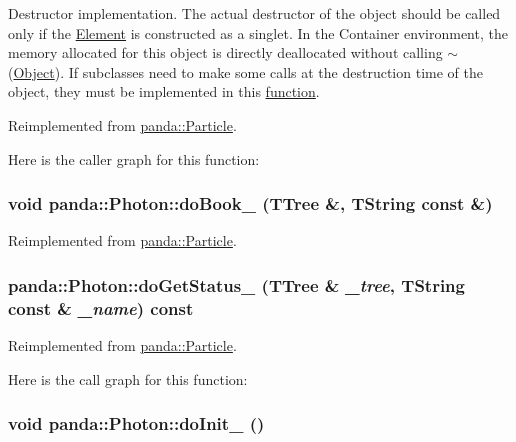 Destructor implementation. The actual destructor of the object should be called only if the \hyperlink{classpanda_1_1Element}{Element} is constructed as a singlet. In the Container environment, the memory allocated for this object is directly deallocated without calling $\sim$(\hyperlink{classpanda_1_1Object}{Object}). If subclasses need to make some calls at the destruction time of the object, they must be implemented in this \hyperlink{namespacepanda_1_1function}{function}. 

Reimplemented from \hyperlink{classpanda_1_1Particle_ad1a5f606b804ac2ec5d7e391aba6bda6}{panda::Particle}.

Here is the caller graph for this function:\hypertarget{classpanda_1_1Photon_aaa6770e70a128a4e4910899f92fbd816}{
\subsubsection[{doBook\_\-}]{\setlength{\rightskip}{0pt plus 5cm}void panda::Photon::doBook\_\- (TTree \&, \/  TString const \&)}}
\label{classpanda_1_1Photon_aaa6770e70a128a4e4910899f92fbd816}


Reimplemented from \hyperlink{classpanda_1_1Particle_a3dab1e8430ed2e287ecd8fdbbdcf3c7e}{panda::Particle}.\hypertarget{classpanda_1_1Photon_ae0b07f281f6553d7d1fe088374e6e39b}{
\subsubsection[{doGetStatus\_\-}]{ panda::Photon::doGetStatus\_\- (TTree \& {\em \_\-tree}, \/  TString const \& {\em \_\-name}) const}}
\label{classpanda_1_1Photon_ae0b07f281f6553d7d1fe088374e6e39b}


Reimplemented from \hyperlink{classpanda_1_1Particle_a7dcbf68bc3e74fdef1e3f3c620fb019a}{panda::Particle}.

Here is the call graph for this function:\hypertarget{classpanda_1_1Photon_a445fd29d5ce7a07c93443c05ae830a72}{
\subsubsection[{doInit\_\-}]{\setlength{\rightskip}{0pt plus 5cm}void panda::Photon::doInit\_\- ()}}
\label{classpanda_1_1Photon_a445fd29d5ce7a07c93443c05ae830a72}


